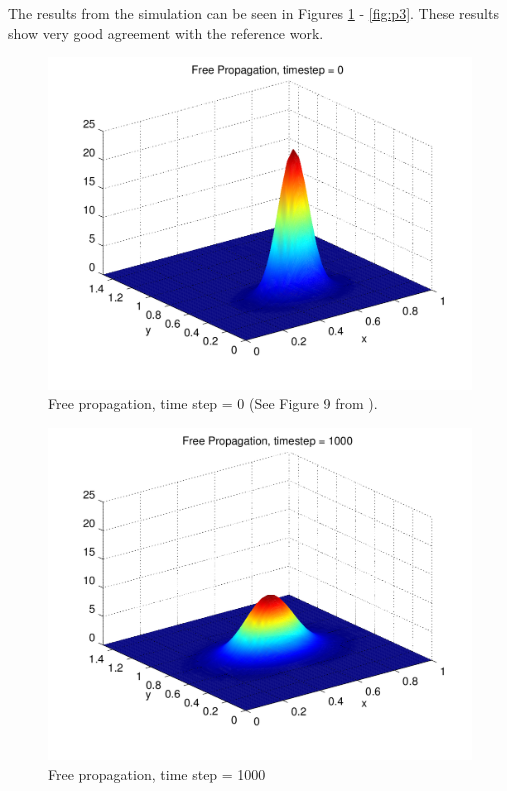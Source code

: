 \documentclass[letterpaper,12pt]{article}
\begin{document}
The results from the simulation can be seen in Figures \ref{fig:p1} - \ref{fig:p3}.  These results show very good agreement with the reference work.

\begin{figure}[!htbp]
\centering
\includegraphics[scale=0.55,trim = 2mm 12mm 12mm 2mm,clip=true]{prop1.png}
\caption{Free propagation, time step = 0 (See Figure 9 from \citep{reference}).}
\label{fig:p1}
\end{figure}

\begin{figure}[!htbp]
\centering
\includegraphics[scale=0.55,trim = 2mm 12mm 12mm 2mm,clip=true]{prop2.png}
\caption{Free propagation, time step = 1000}
\label{fig:p2}
\end{figure}
\end{document}
